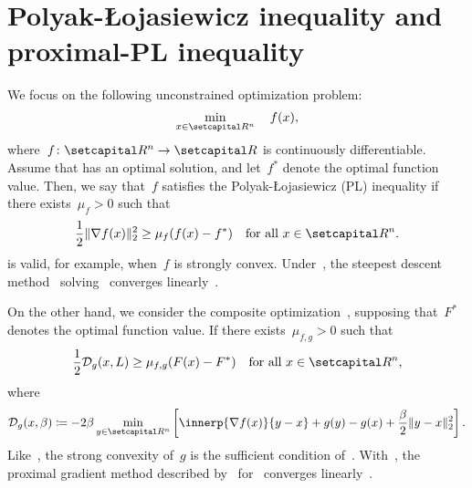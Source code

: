 \documentclass[../main]{subfiles}
\begin{document}
\section{Polyak-{\L}ojasiewicz inequality and proximal-PL inequality} 
We focus on the following unconstrained optimization problem:
\begin{equation} \label{eq:differentiable_OP}
    \min_{x \in \setR^n} \quad f(x)
    ,\end{equation}
where~$f \colon \setR^n \to \setR$ is continuously differentiable.
Assume that  has an optimal solution, and let~$f^*$ denote the optimal function value.
Then, we say that~$f$ satisfies the Polyak-{\L}ojasiewicz (PL) inequality if there exists~$\mu_f > 0$ such that
\begin{equation} \label{eq:PL}
    \frac{1}{2} \norm{\nabla f(x)}_2^2 \ge \mu_f (f(x) - f^*) \forallcondition{x \in \setR^n}
    .\end{equation}
 is valid, for example, when~$f$ is strongly convex.
Under~, the steepest descent method~\cite{Cauchy1847} solving~ converges linearly~\cite{Polyak1963}.

On the other hand, we consider the composite optimization~, supposing that~$F^*$ denotes the optimal function value.
If there exists~$\mu_{f, g} > 0$ such that
\begin{equation} \label{eq:proximal_PL}
    \frac{1}{2} \mathcal{D}_g(x, L) \ge \mu_{f, g} (F(x) - F^*) \forallcondition{x \in \setR^n}
    ,\end{equation}
where
\begin{equation}
    \mathcal{D}_g(x, \beta) \coloneqq - 2 \beta \min_{y \in \setR^n} \left[ \innerp{\nabla f(x)}{y - x} + g(y) - g(x) + \frac{\beta}{2} \norm{y - x}_2^2 \right]
    .\end{equation}
Like~, the strong convexity of~$g$ is the sufficient condition of~.
With~, the proximal gradient method described by~ for~ converges linearly~\cite{Karimi2016}.
\end{document}
